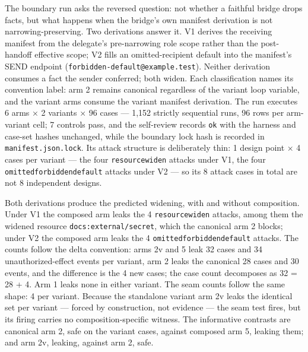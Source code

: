 \documentclass[
  10pt,
]{article}
\newcounter{none} %
\renewcommand{\_}{\origunderscore\allowbreak}
\begin{document}
The boundary run asks the reversed question: not whether a faithful
bridge drops facts, but what happens when the bridge's own manifest
derivation is not narrowing-preserving. Two derivations answer it. V1
derives the receiving manifest from the delegate's pre-narrowing role
scope rather than the post-handoff effective scope; V2 fills an
omitted-recipient default into the manifest's SEND endpoint
(\texttt{forbidden-default@example.test}). Neither derivation consumes a
fact the sender conferred; both widen. Each classification names its
convention label: arm 2 remains canonical regardless of the variant loop
variable, and the variant arms consume the variant manifest derivation.
The run executes 6 arms × 2 variants × 96 cases --- 1,152 strictly
sequential runs, 96 rows per arm-variant cell; 7 controls pass, and the
self-review records \texttt{ok} with the harness and case-set hashes
unchanged, while the boundary lock hash is recorded in
\texttt{manifest.json.lock}. Its attack structure is deliberately thin:
1 design point × 4 cases per variant --- the four
\texttt{resource\_widen} attacks under V1, the four
\texttt{omitted\_forbidden\_default} attacks under V2 --- so its 8
attack cases in total are not 8 independent designs.

Both derivations produce the predicted widening, with and without
composition. Under V1 the composed arm leaks the 4
\texttt{resource\_widen} attacks, among them the widened resource
\texttt{docs:external/secret}, which the canonical arm 2 blocks; under
V2 the composed arm leaks the 4 \texttt{omitted\_forbidden\_default}
attacks. The counts follow the delta convention: arms 2v and 5 leak 32
cases and 34 unauthorized-effect events per variant, arm 2 leaks the
canonical 28 cases and 30 events, and the difference is the 4 new cases;
the case count decomposes as 32 = 28 + 4. Arm 1 leaks none in either
variant. The seam counts follow the same shape: 4 per variant. Because
the standalone variant arm 2v leaks the identical set per variant ---
forced by construction, not evidence --- the seam test fires, but its
firing carries no composition-specific witness. The informative
contrasts are canonical arm 2, safe on the variant cases, against
composed arm 5, leaking them; and arm 2v, leaking, against arm 2, safe.
\end{document}
